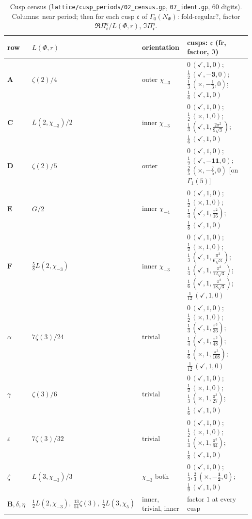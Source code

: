 \documentclass[11pt]{amsart}
\theoremstyle{definition}
\theoremstyle{remark}
\newcommand{\cc}{\mathfrak c}\newcommand{\Pc}{\Pi_{\cc}}\newcommand{\Pq}{\Pi^{q}}
\begin{document}
\begin{table}[ht]
\caption{Cusp census (\texttt{lattice/cusp\_periods/02\_census.gp}, \texttt{07\_ident.gp}, $60$ digits). Columns: near period; then for each cusp $\cc$ of $\Gamma_0(N_\Phi)$: fold-regular?, factor $\Re\Pq_{\cc}/L(\Phi,r)$, $\Im\Pq_{\cc}$.}\label{tab:census}
\small\renewcommand{\arraystretch}{1.15}
\begin{tabular}{@{}llll@{}}\toprule
row & $L(\Phi,r)$ & orientation & cusps: $\cc$ (fr, factor, $\Im$) \\\midrule
$\mathbf A$ & $\zeta(2)/4$ & outer $\chi_{-3}$ & $0\,(\checkmark,1,0)$; $\tfrac12\,(\checkmark,\mathbf{-3},0)$; $\tfrac13\,(\times,-\tfrac13,0)$; $\tfrac16\,(\checkmark,1,0)$\\
$\mathbf C$ & $L(2,\chi_{-3})/2$ & inner $\chi_{-3}$ & $0\,(\checkmark,1,0)$; $\tfrac12\,(\times,1,0)$; $\tfrac13\,(\checkmark,1,\tfrac{2\pi^2}{9\sqrt3})$; $\tfrac16\,(\checkmark,1,0)$\\
$\mathbf D$ & $\zeta(2)/5$ & outer & $0\,(\checkmark,1,0)$; $\tfrac12\,(\checkmark,\mathbf{-11},0)$; $\tfrac25\,(\times,-\tfrac75,0)$ [on $\Gamma_1(5)$]\\
$\mathbf E$ & $G/2$ & inner $\chi_{-4}$ & $0\,(\checkmark,1,0)$; $\tfrac12\,(\times,1,0)$; $\tfrac14\,(\checkmark,1,\tfrac{\pi^2}{16})$; $\tfrac18\,(\checkmark,1,0)$\\
$\mathbf F$ & $\tfrac58L(2,\chi_{-3})$ & inner $\chi_{-3}$ & $0\,(\checkmark,1,0)$; $\tfrac12\,(\times,1,0)$; $\tfrac13\,(\checkmark,1,\tfrac{\pi^2}{6\sqrt3})$; $\tfrac14\,(\checkmark,1,\tfrac{\pi^2}{12\sqrt3})$; $\tfrac16\,(\checkmark,1,\tfrac{\pi^2}{18\sqrt3})$; $\tfrac1{12}\,(\checkmark,1,0)$\\
$\alpha$ & $7\zeta(3)/24$ & trivial & $0\,(\checkmark,1,0)$; $\tfrac12\,(\times,1,0)$; $\tfrac13\,(\checkmark,1,\tfrac{\pi^3}{36})$; $\tfrac14\,(\checkmark,1,\tfrac{\pi^3}{48})$; $\tfrac16\,(\times,1,\tfrac{\pi^3}{108})$; $\tfrac1{12}\,(\checkmark,1,0)$\\
$\gamma$ & $\zeta(3)/6$ & trivial & $0\,(\checkmark,1,0)$; $\tfrac12\,(\times,1,0)$; $\tfrac13\,(\times,1,\tfrac{\pi^3}{27})$; $\tfrac16\,(\checkmark,1,0)$\\
$\varepsilon$ & $7\zeta(3)/32$ & trivial & $0\,(\checkmark,1,0)$; $\tfrac12\,(\times,1,0)$; $\tfrac14\,(\times,1,\tfrac{\pi^3}{64})$; $\tfrac18\,(\checkmark,1,0)$\\
$\zeta$ & $L(3,\chi_{-3})/3$ & $\chi_{-3}$ both & $0\,(\checkmark,1,0)$; $\tfrac13,\tfrac23\,(\times,\mathbf{-\tfrac12},0)$; $\tfrac19\,(\checkmark,1,0)$\\
$\mathbf B,\delta,\eta$ & $\tfrac12L(2,\chi_{-3}),\ \tfrac{13}{54}\zeta(3),\ \tfrac12L(3,\chi_5)$ & inner, trivial, inner & factor $1$ at every cusp\\
\bottomrule
\end{tabular}
\end{table}
\end{document}
